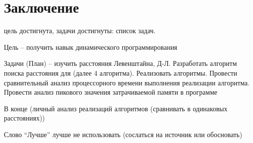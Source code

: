 \chapter*{Заключение}
цель достигнута, задачи достигнуты: список задач.

Цель – получить навык динамического программирования

Задачи (План) – изучить расстояния Левенштайна, Д-Л. Разработать алгоритм поиска расстояния для (далее 4 алгоритма). Реализовать алгоритмы. Провести сравнительный анализ процессорного времени выполнения реализации алгоритма. Провести анализ пикового значения затрачиваемой памяти в программе

В конце (личный анализ реализаций алгоритмов (сравнивать в одинаковых расстояниях))

Слово “Лучше” лучше не использовать (сослаться на источник или обосновать)
